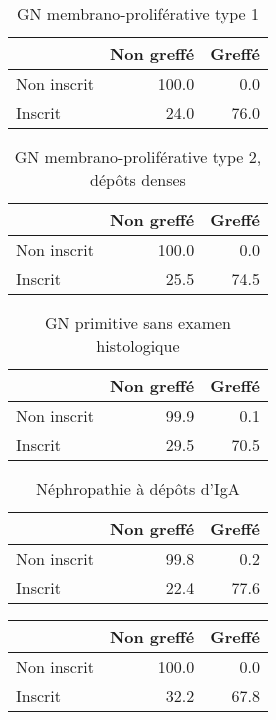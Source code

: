 \documentclass[11pt,a4paper]{article}\usepackage[]{graphicx}\usepackage[]{color}
\begin{document}
\begin{multicols}{2}
\begin{table}[H]
\begin{tabular}{lrr}
  \hline
 & Non greffé & Greffé \\ 
  \hline
Non inscrit & 100.0 & 0.0 \\ 
  Inscrit & 24.0 & 76.0 \\ 
   \hline
\end{tabular}
\caption{GN membrano-proliférative type 1} 
\end{table}
\begin{table}[H]
\centering
\begin{tabular}{lrr}
  \hline
 & Non greffé & Greffé \\ 
  \hline
Non inscrit & 100.0 & 0.0 \\ 
  Inscrit & 25.5 & 74.5 \\ 
   \hline
\end{tabular}
\caption{GN membrano-proliférative type 2, dépôts denses} 
\end{table}
\begin{table}[H]
\centering
\begin{tabular}{lrr}
  \hline
 & Non greffé & Greffé \\ 
  \hline
Non inscrit & 99.9 & 0.1 \\ 
  Inscrit & 29.5 & 70.5 \\ 
   \hline
\end{tabular}
\caption{GN primitive sans examen histologique} 
\end{table}
\begin{table}[H]
\centering
\begin{tabular}{lrr}
  \hline
 & Non greffé & Greffé \\ 
  \hline
Non inscrit & 99.8 & 0.2 \\ 
  Inscrit & 22.4 & 77.6 \\ 
   \hline
\end{tabular}
\caption{Néphropathie à dépôts d'IgA} 
\end{table}
\begin{table}[H]
\centering
\begin{tabular}{lrr}
  \hline
 & Non greffé & Greffé \\ 
  \hline
Non inscrit & 100.0 & 0.0 \\ 
  Inscrit & 32.2 & 67.8 \\ 

\end{tabular}
\end{table}
\end{multicols}
\end{document}
